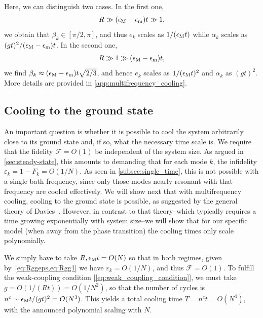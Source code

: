 \documentclass[aps,prx,twocolumn,superscriptaddress,nofootinbib,nolongbibliography,nobalancelastpage,10pt,floatfix]{revtex4-2}
\begin{document}
Here, we can distinguish two cases. In the first one,
\begin{equation}
    R\gg (\epsilon_{\rm M}-\epsilon_{\rm m})t \gg 1,
    \label{eq:Rggeps}
\end{equation}
we obtain that $\beta_k \in[\pi/2,\pi]$, and thus $e_k$ scales as $1/(\epsilon_{\rm M} t)$ while $\alpha_k$ scales as $(gt)^2/(\epsilon_{\rm M} - \epsilon_{\rm m})t$. In the second one,
\begin{equation}
    R\gg 1 \gg (\epsilon_{\rm M}-\epsilon_{\rm m})t,
    \label{eq:Rgg1}
\end{equation}
we find $\beta_k\approx (\epsilon_{\rm M}-\epsilon_{\rm m})t\sqrt{2/3}$, and hence $e_k$ scales as $1/(\epsilon_{\rm M} t)^2$ and $\alpha_k$ as $(gt)^2$. More details are provided in \cref{app:multifrequency_cooling}.

\subsection{Cooling to the ground state}
\label{subsec:cooling_to_gs}

An important question is whether it is possible to cool the system arbitrarily close to its ground state and, if so, what the necessary time scale is. We require that the fidelity $\mathcal{F}=O(1)$ be independent of the system size. As argued in \cref{sec:steady-state}, this amounts to demanding that for each mode $k$, the infidelity $\varepsilon_k = 1 - F_k = O(1/N)$. As seen in \cref{subsec:single_time}, this is not possible with a single bath frequency, since only those modes nearly resonant with that frequency are cooled effectively. We will show next that with multifrequency cooling, cooling to the ground state is possible, as suggested by the general theory of Davies~\cite{Davies1974Markovian}. However, in contrast to that theory--which typically requires a time growing exponentially with system size--we will show that for our specific model (when away from the phase transition) the cooling times only scale polynomially.

We simply have to take $R, \epsilon_{\rm M} t = O(N)$ so that in both regimes, given by~\cref{eq:Rggeps,eq:Rgg1} we have $\varepsilon_k=O(1/N)$, and thus $\mathcal{F}=O(1)$. To fulfill the weak-coupling condition [\cref{eq:weak_coupling_condition}], we must take $g=O(1/(R t))=O(1/N^2)$, so that the number of cycles is $n^c\sim \epsilon_{\rm M} t/(gt)^2 = O(N^3)$. This yields a total cooling time $T=n^c t= O(N^4)$, with the announced polynomial scaling with $N$.
\end{document}
